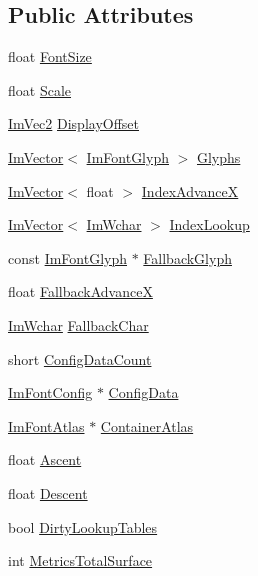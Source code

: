 \subsection*{Public Attributes}
\begin{DoxyCompactItemize}
\item 
float \mbox{\hyperlink{struct_im_font_a423e36d1594281f1a5a537e5b0d0a3d4}{Font\+Size}}
\item 
float \mbox{\hyperlink{struct_im_font_ae98fb07fd8862a7243d77b11f38bba19}{Scale}}
\item 
\mbox{\hyperlink{struct_im_vec2}{Im\+Vec2}} \mbox{\hyperlink{struct_im_font_af9b95f3df0b6d45f45903d82301d7f84}{Display\+Offset}}
\item 
\mbox{\hyperlink{class_im_vector}{Im\+Vector}}$<$ \mbox{\hyperlink{struct_im_font_glyph}{Im\+Font\+Glyph}} $>$ \mbox{\hyperlink{struct_im_font_a1a0901fc1a8cbd41d582d6cef4946bc9}{Glyphs}}
\item 
\mbox{\hyperlink{class_im_vector}{Im\+Vector}}$<$ float $>$ \mbox{\hyperlink{struct_im_font_af906476eda06d8a842d0a843a247f530}{Index\+AdvanceX}}
\item 
\mbox{\hyperlink{class_im_vector}{Im\+Vector}}$<$ \mbox{\hyperlink{imgui_8h_af2c7badaf05a0008e15ef76d40875e97}{Im\+Wchar}} $>$ \mbox{\hyperlink{struct_im_font_a0c948f3741da03da9bc1731e236173c8}{Index\+Lookup}}
\item 
const \mbox{\hyperlink{struct_im_font_glyph}{Im\+Font\+Glyph}} $\ast$ \mbox{\hyperlink{struct_im_font_a0e666b0c49646bd294103f4d288df4b8}{Fallback\+Glyph}}
\item 
float \mbox{\hyperlink{struct_im_font_ad58a5ee4492a3a9fa56f73e5a40d728d}{Fallback\+AdvanceX}}
\item 
\mbox{\hyperlink{imgui_8h_af2c7badaf05a0008e15ef76d40875e97}{Im\+Wchar}} \mbox{\hyperlink{struct_im_font_ae54c2c4184bfcbc7b8f6da9cbc4f93c0}{Fallback\+Char}}
\item 
short \mbox{\hyperlink{struct_im_font_a4a30fc7711d628ad582ccb3188a51ddd}{Config\+Data\+Count}}
\item 
\mbox{\hyperlink{struct_im_font_config}{Im\+Font\+Config}} $\ast$ \mbox{\hyperlink{struct_im_font_afa4eb6cfb979ffa120e9795f328623a1}{Config\+Data}}
\item 
\mbox{\hyperlink{struct_im_font_atlas}{Im\+Font\+Atlas}} $\ast$ \mbox{\hyperlink{struct_im_font_a8a5e0df6be5e3cabe91ae830524db960}{Container\+Atlas}}
\item 
float \mbox{\hyperlink{struct_im_font_a5238ef18f8ad02b783fb8b3a195b708e}{Ascent}}
\item 
float \mbox{\hyperlink{struct_im_font_abcca12aa908bf7105433e7db6088a5e5}{Descent}}
\item 
bool \mbox{\hyperlink{struct_im_font_a3858e851f69b3abbbefad76030a546ff}{Dirty\+Lookup\+Tables}}
\item 
int \mbox{\hyperlink{struct_im_font_a8087b2ee8b27dcf5c6e30a8318f87cc7}{Metrics\+Total\+Surface}}
\end{DoxyCompactItemize}


